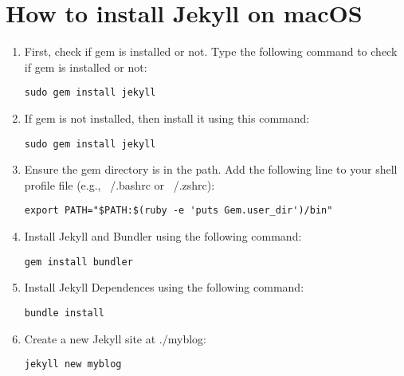 \documentclass{book}
\begin{document}
\section*{How to install Jekyll on macOS}
\begin{enumerate}
\item First, check if gem is installed or not. Type the following command to check if gem is installed or not:
 \begin{verbatim} 
sudo gem install jekyll 
\end{verbatim}
\item If gem is not installed, then install it using this command:
 \begin{verbatim} 
sudo gem install jekyll 
\end{verbatim}

\item Ensure the gem directory is in the path. Add the following line to your shell profile file (e.g., ~/.bashrc or ~/.zshrc):
 \begin{verbatim} 
export PATH="$PATH:$(ruby -e 'puts Gem.user_dir')/bin"
\end{verbatim}

\item Install Jekyll and Bundler using the following command:
 \begin{verbatim}gem install bundler
\end{verbatim}
\item Install Jekyll Dependences using the following command:
 \begin{verbatim}bundle install
\end{verbatim}
\item Create a new Jekyll site at ./myblog:
 \begin{verbatim}jekyll new myblog
\end{verbatim}

\end{enumerate}

\end{document}
